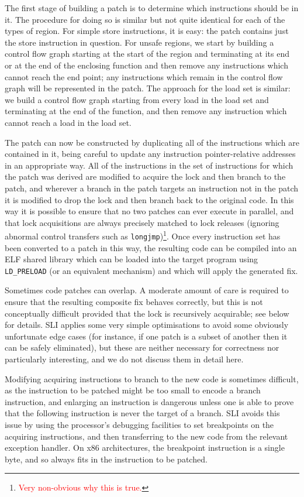 \documentclass[10pt,twocolumn,preprint,natbib,authoryear]{sigplanconf}
\newcommand{\editorial}[1]{\textcolor{red}{\footnote{\textcolor{red}{#1}}}}
\begin{document}
The first stage of building a patch is to determine which instructions
should be in it.  The procedure for doing so is similar but not quite
identical for each of the types of region.  For simple store
instructions, it is easy: the patch contains just the store
instruction in question.  For unsafe regions, we start by building a
control flow graph starting at the start of the region and terminating
at its end or at the end of the enclosing function and then remove any
instructions which cannot reach the end point; any instructions which
remain in the control flow graph will be represented in the patch.
The approach for the load set is similar: we build a control flow
graph starting from every load in the load set and terminating at the
end of the function, and then remove any instruction which cannot
reach a load in the load set.

The patch can now be constructed by duplicating all of the
instructions which are contained in it, being careful to update any
instruction pointer-relative addresses in an appropriate way.  All of
the instructions in the set of instructions for which the patch was
derived are modified to acquire the lock and then branch to the patch,
and wherever a branch in the patch targets an instruction not in the
patch it is modified to drop the lock and then branch back to the
original code.  In this way it is possible to ensure that no two
patches can ever execute in parallel, and that lock acquisitions are
always precisely matched to lock releases (ignoring abnormal control
transfers such as \verb|longjmp|)\editorial{Very non-obvious why this
  is true.}.  Once every instruction set has been converted to a patch
in this way, the resulting code can be compiled into an ELF shared
library which can be loaded into the target program using
\verb|LD_PRELOAD| (or an equivalent mechanism) and which will apply
the generated fix.

Sometimes code patches can overlap.  A moderate amount of care is
required to ensure that the resulting composite fix behaves correctly,
but this is not conceptually difficult provided that the lock is
recursively acquirable; see below for details.  SLI applies some very
simple optimisations to avoid some obviously unfortunate edge cases
(for instance, if one patch is a subset of another then it can be
safely eliminated), but these are neither necessary for correctness
nor particularly interesting, and we do not discuss them in detail
here.

Modifying acquiring instructions to branch to the new code is
sometimes difficult, as the instruction to be patched might be too
small to encode a branch instruction, and enlarging an instruction is
dangerous unless one is able to prove that the following instruction
is never the target of a branch.  SLI avoids this issue by using the
processor's debugging facilities to set breakpoints on the acquiring
instructions, and then transferring to the new code from the relevant
exception handler.  On x86 architectures, the breakpoint instruction
is a single byte, and so always fits in the instruction to be patched.
\end{document}
